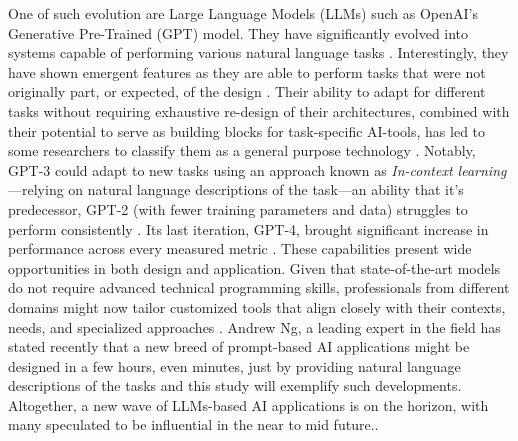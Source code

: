 \documentclass[sn-mathphys, Numbered]{sn-jnl}%
\theoremstyle{thmstyleone}%
\theoremstyle{thmstyletwo}%
\theoremstyle{thmstylethree}%
\begin{document}
One of such evolution are Large Language Models (LLMs) such as OpenAI's Generative Pre-Trained (GPT) model. They have significantly evolved into systems capable of performing various natural language tasks \parencite{brown_language_2020}. Interestingly, they have shown emergent features as they are able to perform tasks that were not originally part, or expected, of the design \parencite{wei_emergent_2022}. Their ability to adapt for different tasks without requiring exhaustive re-design of their architectures, combined with their potential to serve as building blocks for task-specific AI-tools, has led to some researchers to classify them as a general purpose technology \parencite{eloundou_gpts_2023}. Notably, GPT-3 could adapt to new tasks using an approach known as \textit{In-context learning}---relying on natural language descriptions of the task---an ability that it's predecessor, GPT-2 (with fewer training parameters and data) struggles to perform consistently \parencite{bommasani_opportunities_2022, wei_emergent_2022}. Its last iteration, GPT-4, brought significant increase in performance across every measured metric \parencite{openai2023gpt4}.
These capabilities present wide opportunities in both design and application. Given that state-of-the-art models do not require advanced technical programming skills, professionals from different domains might now tailor customized tools that align closely with their contexts, needs, and specialized approaches \parencite{cain_gpteammate_2023}. Andrew Ng, a leading expert in the field has stated recently that a new breed of prompt-based AI applications might be designed in a few hours, even minutes, just by providing natural language descriptions of the tasks \parencite{unknown-author-2023} and this study will exemplify such developments. Altogether, a new wave of LLMs-based AI applications is on the horizon, with many speculated to be influential in the near to mid future.\parencite{bommasani_opportunities_2022, bubeck_sparks_2023}. 
\end{document}
